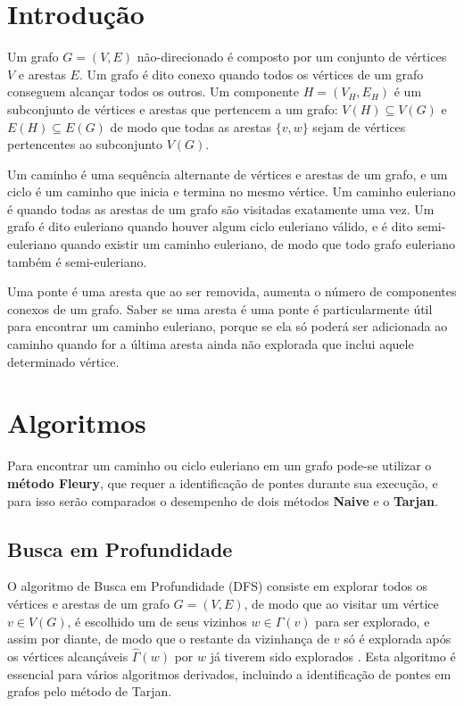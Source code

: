 \documentclass[12pt]{article}
\begin{document}
\section{Introdução}

Um grafo $G = (V, E)$ não-direcionado é composto por um conjunto de vértices $V$ e arestas $E$. Um grafo é dito conexo quando todos os vértices de um grafo conseguem alcançar todos os outros. Um componente $H = (V_H, E_H)$ é um subconjunto de vértices e arestas que pertencem a um grafo: $V(H) \subseteq V(G)$ e $E(H) \subseteq E(G)$ de modo que todas as arestas $\{ v, w \}$ sejam de vértices pertencentes ao subconjunto $V(G)$.

Um caminho é uma sequência alternante de vértices e arestas de um grafo, e um ciclo é um caminho que inicia e termina no mesmo vértice. Um caminho euleriano é quando todas as arestas de um grafo são visitadas exatamente uma vez. Um grafo é dito euleriano quando houver algum ciclo euleriano válido, e é dito semi-euleriano quando existir um caminho euleriano, de modo que todo grafo euleriano também é semi-euleriano.

Uma ponte é uma aresta que ao ser removida, aumenta o número de componentes conexos de um grafo. Saber se uma aresta é uma ponte é particularmente útil para encontrar um caminho euleriano, porque se ela só poderá ser adicionada ao caminho quando for a última aresta ainda não explorada que inclui aquele determinado vértice.

\section{Algoritmos}

Para encontrar um caminho ou ciclo euleriano em um grafo pode-se utilizar o \textbf{método Fleury}, que requer a identificação de pontes durante sua execução, e para isso serão comparados o desempenho de dois métodos \textbf{Naive} e o \textbf{Tarjan}.

\subsection{Busca em Profundidade} \label{dfs}

O algoritmo de Busca em Profundidade (DFS) consiste em explorar todos os vértices e arestas de um grafo $G = (V, E)$, de modo que ao visitar um vértice $v \in V(G)$, é escolhido um de seus vizinhos $w \in \Gamma(v)$ para ser explorado, e assim por diante, de modo que o restante da vizinhança de $v$ só é explorada após os vértices alcançáveis $\hat{\Gamma}(w)$ por $w$ já tiverem sido explorados \cite{Tarjan1972}. Esta algoritmo é essencial para vários algoritmos derivados, incluindo a identificação de pontes em grafos pelo método de Tarjan.
\end{document}
